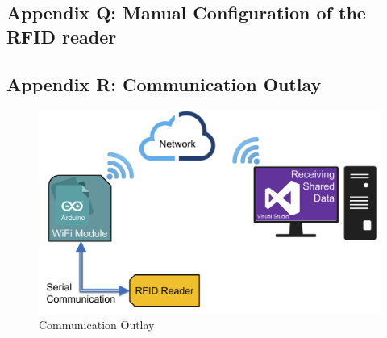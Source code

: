 \subsection{Appendix Q: Manual Configuration of the RFID reader}\label{Sec_AppM}
\scriptsize

\pagebreak

\subsection{Appendix R: Communication Outlay}\label{Sec_AppN}
\begin{figure}[!htbp]
	\centering
	\includegraphics[width = 15cm]{Pictures/communication}
	\caption{Communication Outlay}
	\label{com}
\end{figure}
\pagebreak